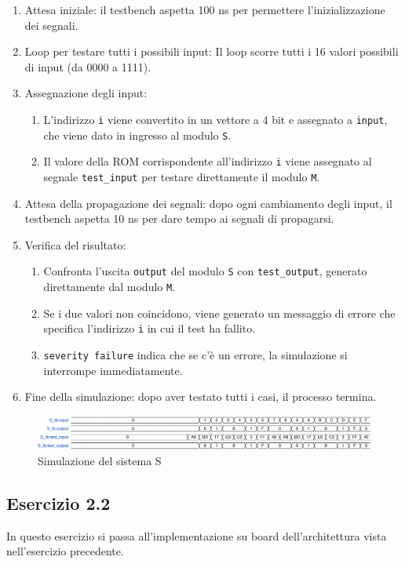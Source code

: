 \begin{enumerate}
    \item Attesa iniziale: il testbench aspetta 100 ns per permettere l'inizializzazione dei segnali.
    \item Loop per testare tutti i possibili input: Il loop scorre tutti i 16 valori possibili di input (da 0000 a 1111).
    \item Assegnazione degli input:
    \begin{enumerate}
        \item L'indirizzo \texttt{i} viene convertito in un vettore a 4 bit e assegnato a \texttt{input}, che viene dato in ingresso al modulo \texttt{S}.
        \item Il valore della ROM corrispondente all'indirizzo \texttt{i} viene assegnato al segnale \texttt{test\_input} per testare direttamente il modulo \texttt{M}.
    \end{enumerate}
    \item Attesa della propagazione dei segnali: dopo ogni cambiamento degli input, il testbench aspetta 10 ns per dare tempo ai segnali di propagarsi.
    \item Verifica del risultato:
    \begin{enumerate}
        \item Confronta l'uscita \texttt{output} del modulo \texttt{S} con \texttt{test\_output}, generato direttamente dal modulo \texttt{M}.
        \item Se i due valori non coincidono, viene generato un messaggio di errore che specifica l'indirizzo \texttt{i} in cui il test ha fallito.
        \item \texttt{severity failure} indica che se c'è un errore, la simulazione si interrompe immediatamente.
    \end{enumerate}
    \item Fine della simulazione: dopo aver testato tutti i casi, il processo termina.
\end{enumerate}

\begin{figure}[h]
    \centering
    \includegraphics[width=\linewidth]{img/2_S_tb.pdf}
    \caption{Simulazione del sistema S}
    \label{fig:2_S_tb}
\end{figure}

\subsection{Esercizio 2.2}
In questo esercizio si passa all'implementazione su board dell'architettura vista nell'esercizio precedente.

